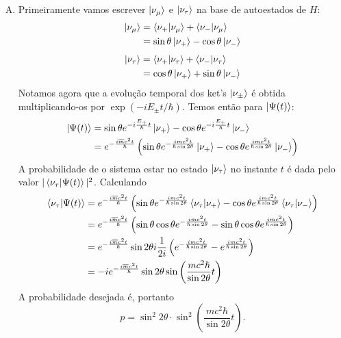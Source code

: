 \documentclass[a4paper, 12pt, notitlepage]{article}
\begin{document}
\begin{enumerate}
\begin{enumerate}[(A)]
  \item Primeiramente vamos escrever $\ket{\nu_\mu}$ e $\ket{\nu_\tau}$ na base de autoestados de $H$:
  \begin{align*}
  \ket{\nu_\mu} &= \bra{\nu_+}\ket{\nu_\mu} + \bra{\nu_-}\ket{\nu_\mu} \\
  &= \sin \theta \ket{\nu_+} - \cos\theta \ket{\nu_-}
  \end{align*}
  \begin{align*}
  \ket{\nu_\tau} &= \bra{\nu_+}\ket{\nu_\tau} + \bra{\nu_-}\ket{\nu_\tau} \\
  &= \cos \theta \ket{\nu_+} + \sin\theta \ket{\nu_-}
  \end{align*}
  Notamos agora que a evolução temporal dos ket's $\ket{\nu_\pm}$ é obtida multiplicando-os por $\exp(-iE_\pm t/\hbar)$. Temos então para $\ket{\Psi(t)}$:
  \begin{align*}
  \ket{\Psi(t)} &= \sin \theta e^{-i\frac{E_+}{\hslash} t} \ket{\nu_+} - \cos \theta e^{-i\frac{E_+}{\hslash} t} \ket{\nu_-} \\
  &= e^{-\frac{i\overline{m} c^2 t}{\hslash}} \left(\sin \theta e^{-\frac{imc^2t}{\hslash \sin 2\theta}}\ket{\nu_+} - \cos \theta e^{\frac{imc^2t}{\hslash \sin 2\theta}}\ket{\nu_-}\right)
  \end{align*}
  A probabilidade de o sistema estar no estado $\ket{\nu_\tau}$ no instante $t$ é dada pelo valor $|\bra{\nu_\tau}\ket{\Psi(t)}|^2$. Calculando
  \begin{align*}
    \bra{\nu_\tau}\ket{\Psi(t)} &= e^{-\frac{i\overline{m} c^2 t}{\hslash}} \left(\sin \theta e^{-\frac{imc^2t}{\hslash \sin 2\theta}}\bra{\nu_\tau}\ket{\nu_+} - \cos \theta e^{\frac{imc^2t}{\hslash \sin 2\theta}}\bra{\nu_\tau}\ket{\nu_-}\right) \\
    &= e^{-\frac{i\overline{m} c^2 t}{\hslash}} \left(\sin \theta \cos \theta e^{-\frac{imc^2t}{\hslash \sin 2\theta}} - \sin \theta \cos \theta e^{\frac{imc^2t}{\hslash \sin 2\theta}}\right) \\
    &= e^{-\frac{i\overline{m} c^2 t}{\hslash}} \sin 2\theta i \frac{1}{2i}\left(e^{-\frac{imc^2t}{\hslash \sin 2\theta}} -  e^{\frac{imc^2t}{\hslash \sin 2\theta}}\right) \\
    &= -i e^{-\frac{i\overline{m} c^2 t}{\hslash}} \sin 2\theta \sin \left(\frac{mc^2 \hslash}{\sin 2\theta} t\right)
  \end{align*}
  A probabilidade desejada é, portanto
  \[ p = \sin^2 2\theta \cdot \sin^2 \left(\frac{mc^2 \hbar}{\sin 2\theta} t\right). \]
  

\end{enumerate}
\end{enumerate}
\end{document}
